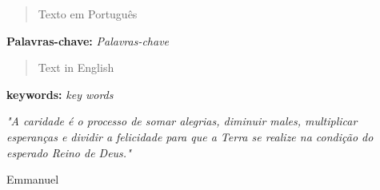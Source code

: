 \documentclass[a4paper, 12pt]{article}
\begin{document}
\graphicspath{{imagens/}{referencias/}{logo/}}  %


\begin{titlepage}

\begin{abstract}
Texto em Português
\end{abstract}
\begin{footnotesize}
\textbf{Palavras-chave:} \textit{Palavras-chave}
\end{footnotesize}
\newpage

\end{titlepage}

\begin{titlepage}

\begin{abstract}
 Text in English
\end{abstract}
\begin{footnotesize}
\textbf{keywords:} \textit{key words}
\end{footnotesize}
\newpage



\end{titlepage}

\begin{titlepage}

   \epigraph{\textit{"A caridade é o processo de somar alegrias, diminuir males, multiplicar esperanças e dividir a felicidade para que a Terra se realize na condição do esperado Reino de Deus."}}{Emmanuel} \newpage

\end{titlepage}
\newpage



\tableofcontents \newpage  %


\newpage

\end{document}
